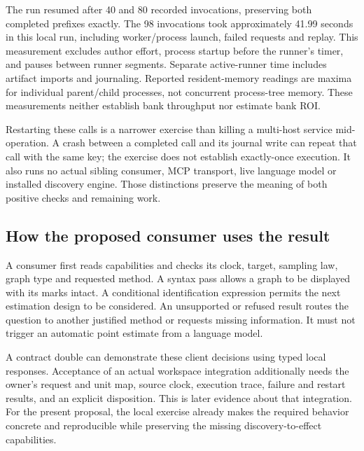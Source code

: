 The run resumed after 40 and 80 recorded invocations, preserving both completed
prefixes exactly. The 98 invocations took approximately 41.99 seconds in this
local run, including worker/process launch, failed requests and replay. This
measurement excludes author effort, process startup before the runner's timer,
and pauses between runner segments. Separate active-runner time includes
artifact imports and journaling. Reported resident-memory readings are maxima
for individual parent/child processes, not concurrent process-tree memory.
These measurements neither establish bank throughput nor estimate bank ROI.

Restarting these calls is a narrower exercise than killing a multi-host
service mid-operation. A crash between a completed call and its journal write
can repeat that call with the same key; the exercise does not establish
exactly-once execution. It also runs no actual sibling consumer, MCP transport,
live language model or installed discovery engine. Those distinctions preserve
the meaning of both positive checks and remaining work.

\subsection{How the proposed consumer uses the result}

A consumer first reads capabilities and checks its clock, target, sampling law,
graph type and requested method. A syntax pass allows a graph to be displayed
with its marks intact. A conditional identification expression permits the
next estimation design to be considered. An unsupported or refused result
routes the question to another justified method or requests missing information.
It must not trigger an automatic point estimate from a language model.

A contract double can demonstrate these client decisions using typed local
responses. Acceptance of an actual workspace integration additionally needs
the owner's request and unit map, source clock, execution trace, failure and
restart results, and an explicit disposition. This is later evidence about
that integration. For the present proposal, the local exercise already makes
the required behavior concrete and reproducible while preserving the missing
discovery-to-effect capabilities.
\label{exec13:discovery-journey-end}
